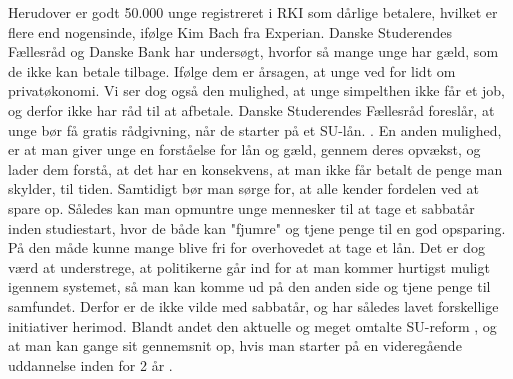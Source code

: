 Herudover er godt 50.000 unge registreret i RKI som dårlige betalere, hvilket er flere end nogensinde, ifølge Kim Bach fra Experian. Danske Studerendes Fællesråd og Danske Bank har undersøgt, hvorfor så mange unge har gæld, som de ikke kan betale tilbage. Ifølge dem er årsagen, at unge ved for lidt om privatøkonomi. Vi ser dog også den mulighed, at unge simpelthen ikke får et job, og derfor ikke har råd til at afbetale. Danske Studerendes Fællesråd foreslår, at unge bør få gratis rådgivning, når de starter på et SU-lån. \cite{dr.dk}. En anden mulighed, er at man giver unge en forståelse for lån og gæld, gennem deres opvækst, og lader dem forstå, at det har en konsekvens, at man ikke får betalt de penge man skylder, til tiden. Samtidigt bør man sørge for, at alle kender fordelen ved at spare op. Således kan man opmuntre unge mennesker til at tage et sabbatår inden studiestart, hvor de både kan "fjumre" og tjene penge til en god opsparing. På den måde kunne mange blive fri for overhovedet at tage et lån.
Det er dog værd at understrege, at politikerne går ind for at man kommer hurtigst muligt igennem systemet, så man kan komme ud på den anden side og tjene penge til samfundet. Derfor er de ikke vilde med sabbatår, og har således lavet forskellige initiativer herimod. Blandt andet den aktuelle og meget omtalte SU-reform \cite{SUreform}, og at man kan gange sit gennemsnit op, hvis man starter på en videregående uddannelse inden for 2 år \cite{SabbatAar}.
 